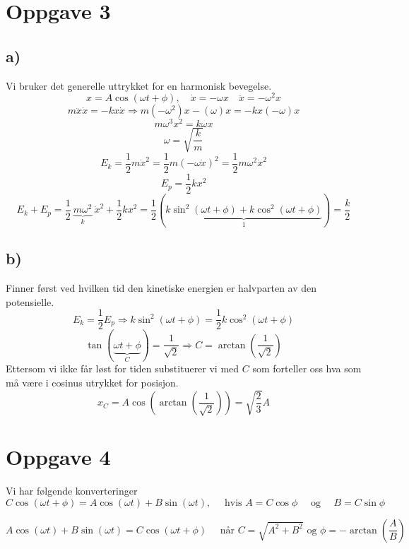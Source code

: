 \documentclass{article}
\begin{document}
\newpage
\section*{Oppgave 3}
  
\subsection*{a)}
  
Vi bruker det generelle uttrykket for en harmonisk bevegelse. 
\[
x = A \cos(ωt + ϕ), \quad \dot{x} = -ωx \quad \ddot{x} = -ω^{2}x
\]
\[
  m\ddot{x}\dot{x} = -  kx \dot{x} ⇒ m (-ω^{2})x -(ω)x = -kx (-ω)x
\]
\[
mω^{3} x^{2} = kωx
\]
\[
ω = \sqrt{\frac{k}{m}} 
\]
\[
E_k = \frac{1}{2}m \dot{x}^{2} = \frac{1}{2}m \left( -ω \dot{x} \right) ^{2} = \frac{1}{2}mω^{2}\dot{x}^{2} 
\] 
\[
E_p = \frac{1}{2}kx^{2}
\]
\[
E_k + E_p = \frac{1}{2}\ \underbrace{mω^{2}}_{k}\ \dot{x}^{2} + \frac{1}{2}kx^{2} = \frac{1}{2} \left(\underbrace{k\sin^{2}(ωt + ϕ) + k \cos ^{2}(ωt + ϕ)}_{1} \right) = \frac{k}{2}
\]

\subsection*{b)}
Finner først ved hvilken tid den kinetiske energien er halvparten av den potensielle. 
\[
E_k = \frac{1}{2} E_p ⇒ k \sin ^{2} (ωt + ϕ) = \frac{1}{2} k \cos ^{2} (ωt + ϕ)
\]
\[
\tan (\underbrace{ωt + ϕ}_{C}) = \frac{1}{\sqrt{2}} ⇒ C = \arctan \left( \frac{1}{\sqrt{2}} \right)
\]
Ettersom vi ikke får løst for tiden substituerer vi med $C$ som forteller oss hva som må være i cosinus utrykket for posisjon. 
\[
x_{C} = A \cos \left(\arctan \left( \frac{1}{\sqrt{2}} \right)  \right) = \sqrt{\frac{2}{3}}A
\]

\newpage
\section*{Oppgave 4}
Vi har følgende konverteringer 
\begin{equation}\label{eq: con_1}
  C \cos (ωt + ϕ) = A \cos (ωt) + B \sin (ωt), \quad \text{ hvis } A = C \cos ϕ \quad \text{ og } \quad B = C \sin ϕ
\end{equation}

\begin{equation}\label{eq: con_2}
  A \cos (ωt) + B \sin (ωt) = C \cos (ωt + ϕ) \quad \text{ når } C = \sqrt{A^2 + B^2} \text{ og } ϕ = - \arctan \left( \frac{A}{B} \right) 
\end{equation}
\end{document}
